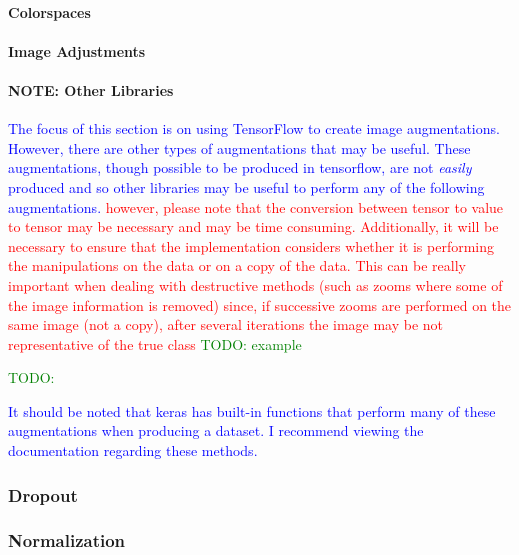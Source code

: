 
\paragraph{Colorspaces}


\paragraph{Image Adjustments}


\paragraph{NOTE: Other Libraries}

\textcolor{blue}{The focus of this section is on using TensorFlow to create image augmentations. However, there are other types of augmentations that may be useful. These augmentations, though possible to be produced in tensorflow, are not \textit{easily} produced and so other libraries may be useful to perform any of the following augmentations. \textcolor{red}{however, please note that the conversion between tensor to value to tensor may be necessary and may be time consuming. Additionally, it will be necessary to ensure that the implementation considers whether it is performing the manipulations on the data or on a copy of the data. This can be really important when dealing with destructive methods (such as zooms where some of the image information is removed) since, if successive zooms are performed on the same image (not a copy), after several iterations the image may be not representative of the true class \textcolor{green}{TODO: example}}}

\textcolor{green}{TODO:}

\textcolor{blue}{It should be noted that keras has built-in functions that perform many of these augmentations when producing a dataset. I recommend viewing the documentation regarding these methods.}



\subsubsection{Dropout}



\subsubsection{Normalization}

